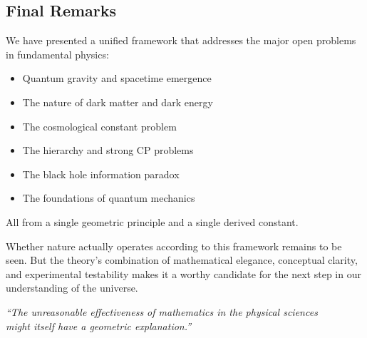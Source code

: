 \subsection{Final Remarks}

We have presented a unified framework that addresses the major open problems in fundamental physics:
\begin{itemize}
    \item Quantum gravity and spacetime emergence
    \item The nature of dark matter and dark energy
    \item The cosmological constant problem
    \item The hierarchy and strong CP problems
    \item The black hole information paradox
    \item The foundations of quantum mechanics
\end{itemize}

All from a single geometric principle and a single derived constant.

Whether nature actually operates according to this framework remains to be seen. But the theory's combination of mathematical elegance, conceptual clarity, and experimental testability makes it a worthy candidate for the next step in our understanding of the universe.

\vspace{1cm}

\begin{center}
\textit{``The unreasonable effectiveness of mathematics in the physical sciences\\
might itself have a geometric explanation.''}
\end{center}

